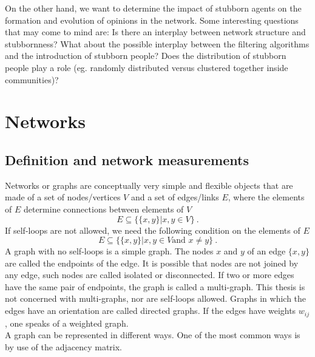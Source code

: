 \documentclass[11 pt , letterpaper , twoside , openright]{book}
\begin{document}
\newline
On the other hand, we want to determine the impact of stubborn agents on the formation and evolution of opinions in the network. Some interesting questions that may come to mind are: Is there an interplay between network structure and stubbornness? What about the possible interplay between the filtering algorithms and the introduction of stubborn people? Does the distribution of stubborn people play a role (eg. randomly distributed versus clustered together inside communities)? \\




\chapter{Networks}
\label{chap2}



\section{Definition and network measurements}
\label{netDef}

Networks or graphs are conceptually very simple and flexible objects that are made of a set of nodes/vertices $V$ and a set of edges/links $E$, where the elements of $E$ determine connections between elements of $V$ \cite{Costa2018}
\begin{equation}
	E \subseteq \{\{x, y\}| x, y \in V \}\ .
\end{equation}
If self-loops are not allowed, we need the following condition on the elements of $E$
\begin{equation}
	E \subseteq \{\{x, y\}| x, y \in V \text{and\ } x \neq y \} \ .
\end{equation}
A graph with no self-loops is a simple graph. The nodes $x$ and $y$ of an edge $\{x, y\}$ are called the endpoints of the edge. It is possible that nodes are not joined by any edge, such nodes are called isolated or disconnected. If two or more edges have the same pair of endpoints, the graph is called a multi-graph. This thesis is not concerned with multi-graphs, nor are self-loops allowed. Graphs in which the edges have an orientation are called directed graphs. If the edges have weights $w_{ij}$, one speaks of a weighted graph.\\
A graph can be represented in different ways. One of the most common ways is by use of the adjacency matrix.\\
\end{document}
